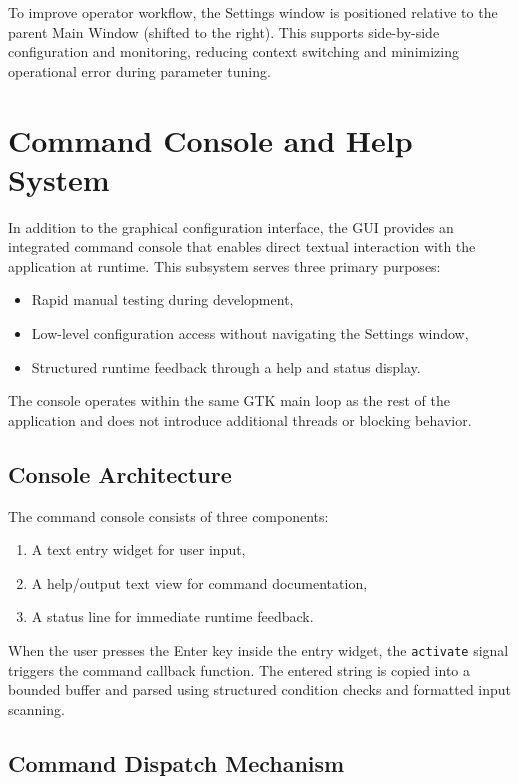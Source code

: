 To improve operator workflow, the Settings window is positioned relative to the parent Main Window (shifted to the right). This supports side-by-side configuration and monitoring, reducing context switching and minimizing operational error during parameter tuning.

\section{Command Console and Help System}
\label{sec:gui_console}

In addition to the graphical configuration interface, the GUI provides an integrated command console that enables direct textual interaction with the application at runtime. This subsystem serves three primary purposes:

\begin{itemize}
	\item Rapid manual testing during development,
	\item Low-level configuration access without navigating the Settings window,
	\item Structured runtime feedback through a help and status display.
\end{itemize}

The console operates within the same GTK main loop as the rest of the application and does not introduce additional threads or blocking behavior.

\subsection{Console Architecture}
\label{sec:gui_console_architecture}

The command console consists of three components:

\begin{enumerate}
	\item A text entry widget for user input,
	\item A help/output text view for command documentation,
	\item A status line for immediate runtime feedback.
\end{enumerate}

When the user presses the Enter key inside the entry widget, the \texttt{activate} signal triggers the command callback function. The entered string is copied into a bounded buffer and parsed using structured condition checks and formatted input scanning.

\subsection{Command Dispatch Mechanism}
\label{sec:gui_command_dispatch}

